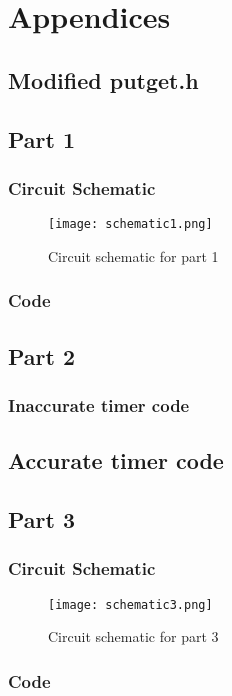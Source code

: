 \documentclass[12pt]{article}
\begin{document}
\pagebreak
\section{Appendices}
\subsection{Modified putget.h}
	
\subsection{Part 1}
	\subsubsection{Circuit Schematic}
		\begin{figure}[h]
			\texttt{[image: schematic1.png]}
			\caption{Circuit schematic for part 1}
			\label{schematic}
		\end{figure} 
	\subsubsection{Code}
		
\subsection{Part 2}
	\subsubsection{Inaccurate timer code}
		
	\subsection{Accurate timer code}
				

\subsection{Part 3}
	\subsubsection{Circuit Schematic}
		\begin{figure}[h]
			\texttt{[image: schematic3.png]}
			\caption{Circuit schematic for part 3}
			\label{schematic}
		\end{figure} 
	\pagebreak
	\subsubsection{Code}
		
	
\end{document}
